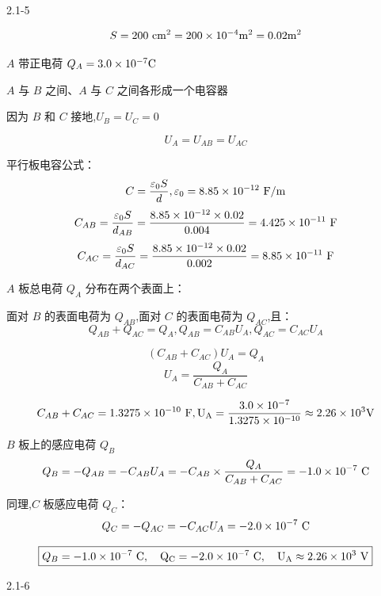 \documentclass{article}
\begin{document}
2.1-5 %


$$ S = 200\ \rm{cm}^2 = 200 \times 10^{-4} \rm{m}^2 = 0.02\rm{m}^2 $$

$ A $ 带正电荷 $ Q_A = 3.0 \times 10^{-7} \rm{C} $

$ A $ 与 $ B $ 之间、$ A $ 与 $ C $ 之间各形成一个电容器

因为 $ B $ 和 $ C $ 接地,$U_B=U_C=0$

$$U_A = U_{AB} = U_{AC}$$

平行板电容公式：
$$C = \frac{\varepsilon_0 S}{d},\varepsilon_0 = 8.85 \times 10^{-12} \ \rm{F/m}$$
$$C_{AB} = \frac{\varepsilon_0 S}{d_{AB}} = \frac{8.85\times 10^{-12} \times 0.02}{0.004}= 4.425\times 10^{-11} \ \rm{F}$$
$$C_{AC} = \frac{\varepsilon_0 S}{d_{AC}} = \frac{8.85\times 10^{-12} \times 0.02}{0.002}= 8.85\times 10^{-11} \ \rm{F}$$


$ A $ 板总电荷 $ Q_A $ 分布在两个表面上：  

面对 $ B $ 的表面电荷为 $ Q_{AB} $,面对 $ C $ 的表面电荷为 $ Q_{AC} $,且：
$$Q_{AB} + Q_{AC} = Q_A ,Q_{AB} = C_{AB} U_A, Q_{AC} = C_{AC} U_A$$

$$(C_{AB} + C_{AC}) U_A = Q_A$$
$$U_A = \frac{Q_A}{C_{AB} + C_{AC}}$$


$$C_{AB} + C_{AC} = 1.3275\times 10^{-10} \ \rm{F},U_A = \frac{3.0\times 10^{-7}}{1.3275\times 10^{-10}} \approx 2.26\times 10^{3} \rm{V}$$

$ B $ 板上的感应电荷 $ Q_B $
$$Q_B = - Q_{AB} = - C_{AB} U_A= - C_{AB}\times \frac{Q_A}{C_{AB} + C_{AC}}  =- 1.0\times 10^{-7} \ \rm{C}$$

同理,$ C $ 板感应电荷 $ Q_C $：
$$Q_C = - Q_{AC} = - C_{AC} U_A = -2.0\times 10^{-7} \ \rm{C}$$

$$\boxed{Q_B = -1.0\times 10^{-7}\ \rm{C},\quad Q_C = -2.0\times 10^{-7}\ \rm{C},\quad U_A \approx 2.26\times 10^{3}\ \rm{V}}$$

















\newpage

2.1-6 %
\end{document}
